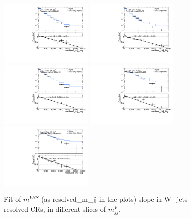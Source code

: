 \begin{figure}[ht]
	\centering
	\includegraphics[width=0.4\textwidth]{Chapter5/2para_msigJJ50to60.pdf}
	\includegraphics[width=0.4\textwidth]{Chapter5/2para_msigJJ60to70.pdf}
	\includegraphics[width=0.4\textwidth]{Chapter5/2para_msigJJ100to150.pdf}
	\includegraphics[width=0.4\textwidth]{Chapter5/2para_msigJJ150to200.pdf}
	\includegraphics[width=0.4\textwidth]{Chapter5/2para_msigJJ200to300.pdf}
	\caption{\label{Fig:mjj_dataMC_fit_resolved} Fit of $m^{VBS}$ (as resolved\_m\_jj in the plots) slope in W+jets resolved CRs, in different slices of $m^{V}_{jj}$. }
\end{figure}


